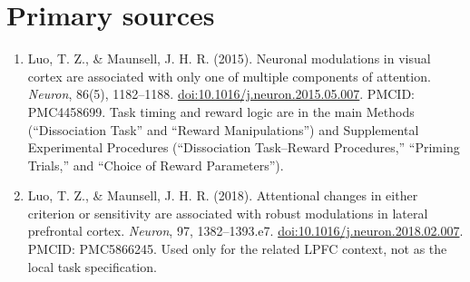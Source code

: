 \documentclass[10pt]{article}
\begin{document}
\section*{Primary sources}
\begin{enumerate}[leftmargin=1.4em]
\item Luo, T. Z., \& Maunsell, J. H. R. (2015). Neuronal modulations in visual cortex are associated with only one of multiple components of attention. \emph{Neuron}, 86(5), 1182--1188. \href{https://doi.org/10.1016/j.neuron.2015.05.007}{doi:10.1016/j.neuron.2015.05.007}. PMCID: PMC4458699. Task timing and reward logic are in the main Methods (``Dissociation Task'' and ``Reward Manipulations'') and Supplemental Experimental Procedures (``Dissociation Task--Reward Procedures,'' ``Priming Trials,'' and ``Choice of Reward Parameters'').
\item Luo, T. Z., \& Maunsell, J. H. R. (2018). Attentional changes in either criterion or sensitivity are associated with robust modulations in lateral prefrontal cortex. \emph{Neuron}, 97, 1382--1393.e7. \href{https://doi.org/10.1016/j.neuron.2018.02.007}{doi:10.1016/j.neuron.2018.02.007}. PMCID: PMC5866245. Used only for the related LPFC context, not as the local task specification.
\end{enumerate}
\end{document}
